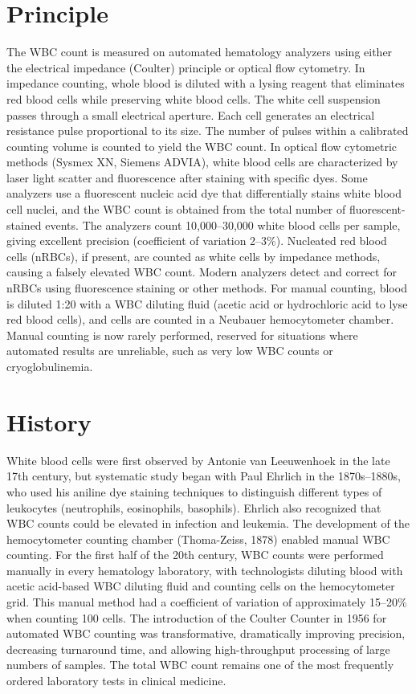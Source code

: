 \section*{Principle}
The WBC count is measured on automated hematology analyzers using either the electrical impedance (Coulter) principle or optical flow cytometry. In impedance counting, whole blood is diluted with a lysing reagent that eliminates red blood cells while preserving white blood cells. The white cell suspension passes through a small electrical aperture. Each cell generates an electrical resistance pulse proportional to its size. The number of pulses within a calibrated counting volume is counted to yield the WBC count. In optical flow cytometric methods (Sysmex XN, Siemens ADVIA), white blood cells are characterized by laser light scatter and fluorescence after staining with specific dyes. Some analyzers use a fluorescent nucleic acid dye that differentially stains white blood cell nuclei, and the WBC count is obtained from the total number of fluorescent-stained events. The analyzers count 10,000--30,000 white blood cells per sample, giving excellent precision (coefficient of variation 2--3\%). Nucleated red blood cells (nRBCs), if present, are counted as white cells by impedance methods, causing a falsely elevated WBC count. Modern analyzers detect and correct for nRBCs using fluorescence staining or other methods. For manual counting, blood is diluted 1:20 with a WBC diluting fluid (acetic acid or hydrochloric acid to lyse red blood cells), and cells are counted in a Neubauer hemocytometer chamber. Manual counting is now rarely performed, reserved for situations where automated results are unreliable, such as very low WBC counts or cryoglobulinemia.

\section*{History}
White blood cells were first observed by Antonie van Leeuwenhoek in the late 17th century, but systematic study began with Paul Ehrlich in the 1870s--1880s, who used his aniline dye staining techniques to distinguish different types of leukocytes (neutrophils, eosinophils, basophils). Ehrlich also recognized that WBC counts could be elevated in infection and leukemia. The development of the hemocytometer counting chamber (Thoma-Zeiss, 1878) enabled manual WBC counting. For the first half of the 20th century, WBC counts were performed manually in every hematology laboratory, with technologists diluting blood with acetic acid-based WBC diluting fluid and counting cells on the hemocytometer grid. This manual method had a coefficient of variation of approximately 15--20\% when counting 100 cells. The introduction of the Coulter Counter in 1956 for automated WBC counting was transformative, dramatically improving precision, decreasing turnaround time, and allowing high-throughput processing of large numbers of samples. The total WBC count remains one of the most frequently ordered laboratory tests in clinical medicine.

